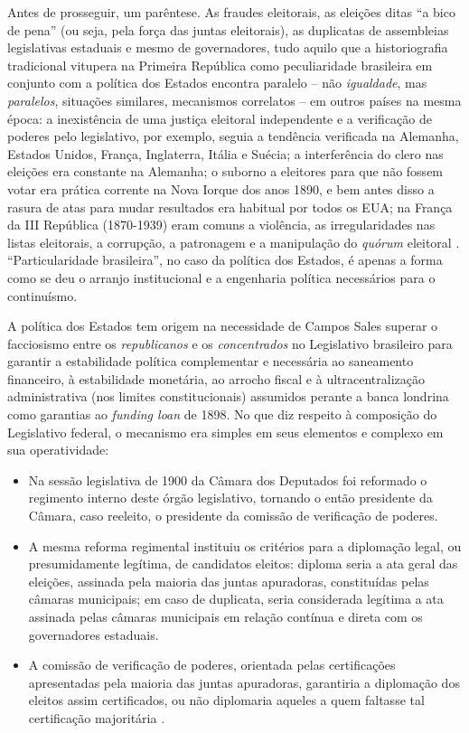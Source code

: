 Antes de prosseguir, um parêntese. As fraudes eleitorais, as eleições ditas ``a bico de pena'' (ou seja, pela força das juntas eleitorais), as duplicatas de assembleias legislativas estaduais e mesmo de governadores, tudo aquilo que a historiografia tradicional vitupera na Primeira República como peculiaridade brasileira em conjunto com a política dos Estados encontra paralelo -- não \textit{igualdade}, mas \textit{paralelos}, situações similares, mecanismos correlatos -- em outros países na mesma época: a inexistência de uma justiça eleitoral independente e a verificação de poderes pelo legislativo, por exemplo, seguia a tendência verificada na Alemanha, Estados Unidos, França, Inglaterra, Itália e Suécia; a interferência do clero nas eleições era constante na Alemanha; o suborno a eleitores para que não fossem votar era prática corrente na Nova Iorque dos anos 1890, e bem antes disso a rasura de atas para mudar resultados era habitual por todos os EUA; na França da III República (1870-1939) eram comuns a violência, as irregularidades nas listas eleitorais, a corrupção, a patronagem e a manipulação do \textit{quórum} eleitoral \cite{riccizulini_fraude_2012}. ``Particularidade brasileira'', no caso da política dos Estados, é apenas a forma como se deu o arranjo institucional e a engenharia política necessários para o continuísmo.

A política dos Estados tem origem na necessidade de Campos Sales superar o facciosismo entre os \textit{republicanos} e os \textit{concentrados} no Legislativo brasileiro para garantir a estabilidade política complementar e necessária ao saneamento financeiro, à estabilidade monetária, ao arrocho fiscal e à ultracentralização administrativa (nos limites constitucionais) assumidos perante a banca londrina como garantias ao \textit{funding loan} de 1898. No que diz respeito à composição do Legislativo federal, o mecanismo era simples em seus elementos e complexo em sua operatividade:

\begin{itemize}
\item Na sessão legislativa de 1900 da Câmara dos Deputados foi reformado o regimento interno deste órgão legislativo, tornando o então presidente da Câmara, caso reeleito, o presidente da comissão de verificação de poderes.
\item A mesma reforma regimental instituiu os critérios para a diplomação legal, ou presumidamente legítima, de candidatos eleitos: diploma seria a ata geral das eleições, assinada pela maioria das juntas apuradoras, constituídas pelas câmaras municipais; em caso de duplicata, seria considerada legítima a ata assinada pelas câmaras municipais em relação contínua e direta com os governadores estaduais.
\item A comissão de verificação de poderes, orientada pelas certificações apresentadas pela maioria das juntas apuradoras, garantiria a diplomação dos eleitos assim certificados, ou não diplomaria aqueles a quem faltasse tal certificação majoritária \cite{carone_textcontext_1973,carone_evolucao_1977,silva_opodercivil_1975}.
\end{itemize}

